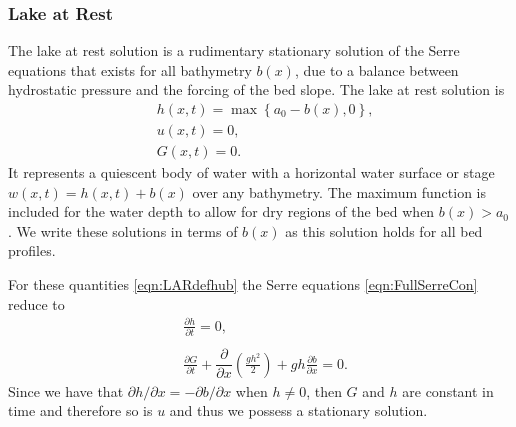 \subsubsection{Lake at Rest}
The lake at rest solution is a rudimentary stationary solution of the Serre equations that exists for all bathymetry $b(x)$, due to a balance between hydrostatic pressure and the forcing of the bed slope. The lake at rest solution is
\begin{subequations}
	\begin{align}
	&h(x,t) = \max\left\lbrace a_0 - b(x), 0 \right\rbrace, \\
	&u(x,t) = 0 , \\
	&G(x,t) = 0 .
	\end{align}
	\label{eqn:LARdefhub}
\end{subequations}
It represents a quiescent body of water with a horizontal water surface or stage $w(x,t) = h(x,t) + b(x)$ over any bathymetry. The maximum function is included for the water depth to allow for dry regions of the bed when $b(x) > a_0$. We write these solutions in terms of $b(x)$ as this solution holds for all bed profiles. 

For these quantities \eqref{eqn:LARdefhub} the Serre equations \eqref{eqn:FullSerreCon} reduce to
\begin{align*}
& \frac{\partial h}{\partial t}  = 0 , \\  \nonumber \\
&\frac{\partial G}{\partial t}  +\dfrac{\partial}{\partial x} \left(\frac{gh^2}{2}\right) + gh \frac{\partial b}{\partial x} = 0.
\end{align*}
Since we have that $\partial h / \partial x =  - \partial b / \partial x$ when $h \neq 0$, then $G$ and $h$ are constant in time and therefore so is $u$ and thus we possess a stationary solution. 
  
